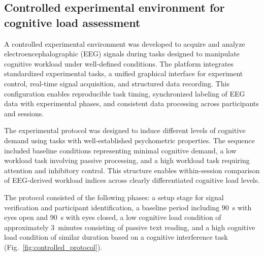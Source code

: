 \documentclass[10pt]{iopart}
\begin{document}
\subsection{Controlled experimental environment for cognitive load assessment}

A controlled experimental environment was developed to acquire and analyze electroencephalographic (EEG) signals during tasks designed to manipulate cognitive workload under well-defined conditions. The platform integrates standardized experimental tasks, a unified graphical interface for experiment control, real-time signal acquisition, and structured data recording. This configuration enables reproducible task timing, synchronized labeling of EEG data with experimental phases, and consistent data processing across participants and sessions.

The experimental protocol was designed to induce different levels of cognitive demand using tasks with well-established psychometric properties. The sequence included baseline conditions representing minimal cognitive demand, a low workload task involving passive processing, and a high workload task requiring attention and inhibitory control. This structure enables within-session comparison of EEG-derived workload indices across clearly differentiated cognitive load levels.

The protocol consisted of the following phases: a setup stage for signal verification and participant identification, a baseline period including 90~s with eyes open and 90~s with eyes closed, a low cognitive load condition of approximately 3~minutes consisting of passive text reading, and a high cognitive load condition of similar duration based on a cognitive interference task (Fig.~\ref{fig:controlled_protocol}).
\end{document}
